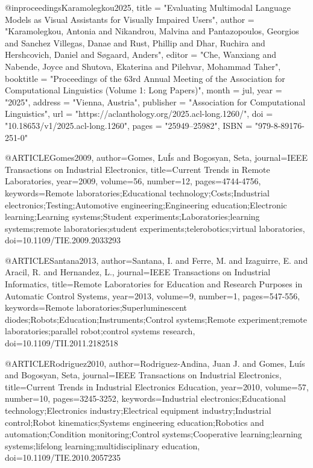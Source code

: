 @inproceedings{Karamolegkou2025,
    title = "Evaluating Multimodal Language Models as Visual Assistants for Visually Impaired Users",
    author = "Karamolegkou, Antonia  and
      Nikandrou, Malvina  and
      Pantazopoulos, Georgios  and
      Sanchez Villegas, Danae  and
      Rust, Phillip  and
      Dhar, Ruchira  and
      Hershcovich, Daniel  and
      S{\o}gaard, Anders",
    editor = "Che, Wanxiang  and
      Nabende, Joyce  and
      Shutova, Ekaterina  and
      Pilehvar, Mohammad Taher",
    booktitle = "Proceedings of the 63rd Annual Meeting of the Association for Computational Linguistics (Volume 1: Long Papers)",
    month = jul,
    year = "2025",
    address = "Vienna, Austria",
    publisher = "Association for Computational Linguistics",
    url = "https://aclanthology.org/2025.acl-long.1260/",
    doi = "10.18653/v1/2025.acl-long.1260",
    pages = "25949--25982",
    ISBN = "979-8-89176-251-0"
}


@ARTICLE{Gomes2009,
  author={Gomes, LuÍs and Bogosyan, Seta},
  journal={IEEE Transactions on Industrial Electronics}, 
  title={Current Trends in Remote Laboratories}, 
  year={2009},
  volume={56},
  number={12},
  pages={4744-4756},
  keywords={Remote laboratories;Educational technology;Costs;Industrial electronics;Testing;Automotive engineering;Engineering education;Electronic learning;Learning systems;Student experiments;Laboratories;learning systems;remote laboratories;student experiments;telerobotics;virtual laboratories},
  doi={10.1109/TIE.2009.2033293}}


@ARTICLE{Santana2013,
  author={Santana, I. and Ferre, M. and Izaguirre, E. and Aracil, R. and Hernandez, L.},
  journal={IEEE Transactions on Industrial Informatics}, 
  title={Remote Laboratories for Education and Research Purposes in Automatic Control Systems}, 
  year={2013},
  volume={9},
  number={1},
  pages={547-556},
  keywords={Remote laboratories;Superluminescent diodes;Robots;Education;Instruments;Control systems;Remote experiment;remote laboratories;parallel robot;control systems research},
  doi={10.1109/TII.2011.2182518}}


@ARTICLE{Rodriguez2010,
  author={Rodriguez-Andina, Juan J. and Gomes, Luís and Bogosyan, Seta},
  journal={IEEE Transactions on Industrial Electronics}, 
  title={Current Trends in Industrial Electronics Education}, 
  year={2010},
  volume={57},
  number={10},
  pages={3245-3252},
  keywords={Industrial electronics;Educational technology;Electronics industry;Electrical equipment industry;Industrial control;Robot kinematics;Systems engineering education;Robotics and automation;Condition monitoring;Control systems;Cooperative learning;learning systems;lifelong learning;multidisciplinary education},
  doi={10.1109/TIE.2010.2057235}}

